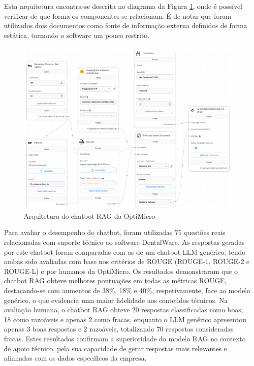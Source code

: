 Esta arquitetura encontra-se descrita no diagrama da Figura \ref{fig:opti-micro-arch}, onde é possível verificar de que forma os componentes se relacionam. É de notar que foram utilizados dois documentos como fonte de informação externa definidos de forma estática, tornando o software um pouco restrito.

\begin{figure}[H]
        \centering
        \includegraphics[width=1\linewidth]{ch3/assets/optimicro-arch.png}
        \caption{Arquitetura do chatbot RAG da OptiMicro \parencite{lee2024development}}
        \label{fig:opti-micro-arch}
\end{figure}


Para avaliar o desempenho do chatbot, foram utilizadas 75 questões reais relacionadas com suporte técnico ao software DentalWare. As respostas geradas por este chatbot foram comparadas com as de um chatbot LLM genérico, tendo ambas sido avaliadas com base nos critérios de ROUGE (ROUGE-1, ROUGE-2 e ROUGE-L) e por humanos da OptiMicro. Os resultados demonstraram que o chatbot RAG obteve melhores pontuações em todas as métricas ROUGE, destacando-se com aumentos de 38\%, 18\% e 40\%, respetivamente, face ao modelo genérico, o que evidencia uma maior fidelidade aos conteúdos técnicos. Na avaliação humana, o chatbot RAG obteve 20 respostas classificadas como boas, 18 como razoáveis e apenas 2 como fracas, enquanto o LLM genérico apresentou apenas 3 boas respostas e 2 razoáveis, totalizando 70 respostas consideradas fracas. Estes resultados confirmam a superioridade do modelo RAG no contexto de apoio técnico, pela sua capacidade de gerar respostas mais relevantes e alinhadas com os dados específicos da empresa.



